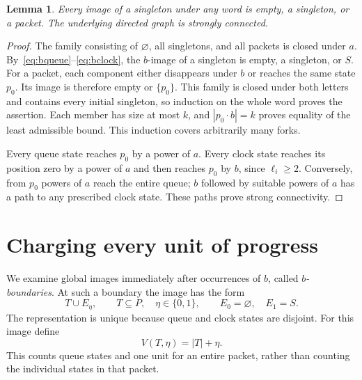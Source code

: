 \documentclass[acmsmall,screen,nonacm,11pt]{acmart}
\newtheorem{lemma}[theorem]{Lemma}
\newcommand{\emp}{\varnothing}
\begin{document}
\begin{lemma}\label{lem:image}
Every image of a singleton under any word is empty, a singleton, or a packet.
The underlying directed graph is strongly connected.
\end{lemma}
\begin{proof}
The family consisting of $\emp$, all singletons, and all packets is closed
under $a$. By~\eqref{eq:bqueue}--\eqref{eq:bclock}, the $b$-image of a
singleton is empty, a singleton, or $S$. For a packet, each component either
disappears under $b$ or reaches the same state $p_0$. Its image is therefore
empty or $\{p_0\}$. This family is closed under both letters and contains
every initial singleton, so induction on the whole word proves the assertion.
Each member has size at most $k$, and $|p_0\cdot b|=k$ proves equality of
the least admissible bound. This induction covers arbitrarily many forks.

Every queue state reaches $p_0$ by a power of $a$. Every clock state reaches
its position zero by a power of $a$ and then reaches $p_0$ by $b$, since
$\ell_i\geq2$. Conversely, from $p_0$ powers of $a$ reach the entire queue;
$b$ followed by suitable powers of $a$ has a path to any prescribed clock
state. These paths prove strong connectivity.
\end{proof}

\section{Charging every unit of progress}

We examine global images immediately after occurrences of $b$, called
\emph{$b$-boundaries}. At such a boundary the image has the form
\[
 T\cup E_\eta,\qquad T\subseteq P,\quad \eta\in\{0,1\},\qquad
 E_0=\emp,\quad E_1=S.
\]
The representation is unique because queue and clock states are disjoint.
For this image define
\[
 V(T,\eta)=|T|+\eta.
\]
This counts queue states and one unit for an entire packet, rather than
counting the individual states in that packet.
\end{document}
